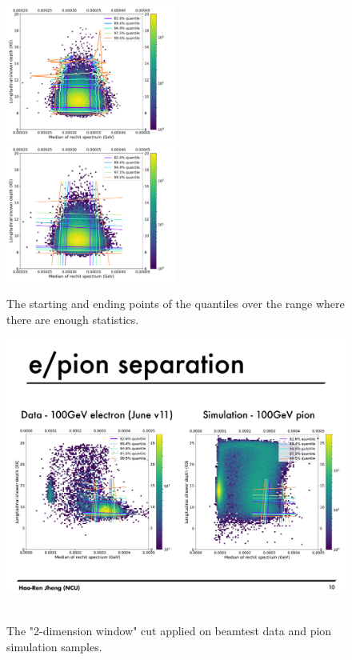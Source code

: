 \begin{figure}[!ht]
    \begin{center}  
    \includegraphics[width=0.5\textwidth]{Fig/fig_HGCAL/Electron-Quantile-100GeV}~
    \includegraphics[width=0.5\textwidth]{Fig/fig_HGCAL/Electron-Quantile-FitResults-100GeV}\\
    \caption{The starting and ending points of the quantiles over the range where there are enough statistics.}
    \label{fig:2DHist-quantile}
    \end{center}
\end{figure}

\begin{figure}[!ht]
    \begin{center}  
    \includegraphics[width=1.0\textwidth]{Fig/fig_HGCAL/Window-Data-pion}~
    \caption{The "2-dimension window" cut applied on beamtest data and pion simulation samples.}
    \label{fig:2DHist-Window-Data-pion}
    \end{center}
\end{figure}

